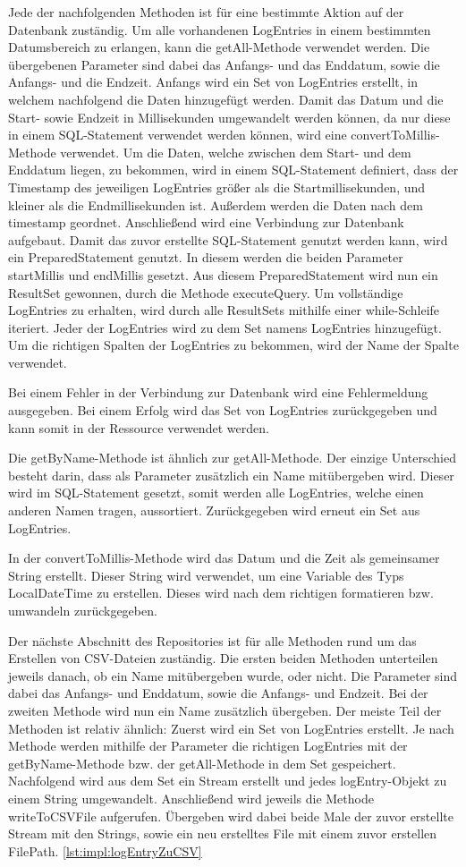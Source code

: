 Jede der nachfolgenden Methoden ist für eine bestimmte Aktion auf der Datenbank zuständig.
Um alle vorhandenen LogEntries in einem bestimmten Datumsbereich zu erlangen, kann die getAll-Methode verwendet werden. Die übergebenen Parameter sind dabei das Anfangs- und das Enddatum, sowie die Anfangs- und die Endzeit. Anfangs wird ein Set von LogEntries erstellt, in welchem nachfolgend die Daten hinzugefügt werden. Damit das Datum und die Start- sowie Endzeit in Millisekunden umgewandelt werden können, da nur diese in einem SQL-Statement verwendet werden können, wird eine convertToMillis-Methode verwendet.
Um die Daten, welche zwischen dem Start- und dem Enddatum liegen, zu bekommen, wird in einem SQL-Statement definiert, dass der Timestamp des jeweiligen LogEntries größer als die Startmillisekunden, und kleiner als die Endmillisekunden ist. Außerdem werden die Daten nach dem timestamp geordnet. Anschließend wird eine Verbindung zur Datenbank aufgebaut. Damit das zuvor erstellte SQL-Statement genutzt werden kann, wird ein PreparedStatement genutzt. In diesem werden die beiden Parameter startMillis und endMillis gesetzt. Aus diesem PreparedStatement wird nun ein ResultSet gewonnen, durch die Methode executeQuery. Um vollständige LogEntries zu erhalten, wird durch alle ResultSets mithilfe einer while-Schleife iteriert. Jeder der LogEntries wird zu dem Set namens LogEntries hinzugefügt. Um die richtigen Spalten der LogEntries zu bekommen, wird der Name der Spalte verwendet.


Bei einem Fehler in der Verbindung zur Datenbank wird eine Fehlermeldung ausgegeben. Bei einem Erfolg wird das Set von LogEntries zurückgegeben und kann somit in der Ressource verwendet werden.


Die getByName-Methode ist ähnlich zur getAll-Methode. Der einzige Unterschied besteht darin, dass als Parameter zusätzlich ein Name mitübergeben wird. Dieser wird im SQL-Statement gesetzt, somit werden alle LogEntries, welche einen anderen Namen tragen, aussortiert. Zurückgegeben wird erneut ein Set aus LogEntries.


In der convertToMillis-Methode wird das Datum und die Zeit als gemeinsamer String erstellt. Dieser String wird verwendet, um eine Variable des Typs LocalDateTime zu erstellen. Dieses wird nach dem richtigen formatieren bzw. umwandeln zurückgegeben.


Der nächste Abschnitt des Repositories ist für alle Methoden rund um das Erstellen von CSV-Dateien zuständig. Die ersten beiden Methoden unterteilen jeweils danach, ob ein Name mitübergeben wurde, oder nicht. Die Parameter sind dabei das Anfangs- und Enddatum, sowie die Anfangs- und Endzeit. Bei der zweiten Methode wird nun ein Name zusätzlich übergeben. Der meiste Teil der Methoden ist relativ ähnlich: Zuerst wird ein Set von LogEntries erstellt. Je nach Methode werden mithilfe der Parameter die richtigen LogEntries mit der getByName-Methode bzw. der getAll-Methode in dem Set gespeichert. Nachfolgend wird aus dem Set ein Stream erstellt und jedes logEntry-Objekt zu einem String umgewandelt. Anschließend wird jeweils die Methode writeToCSVFile aufgerufen. Übergeben wird dabei beide Male der zuvor erstellte Stream mit den Strings, sowie ein neu erstelltes File mit einem zuvor erstellen FilePath. \ref{lst:impl:logEntryZuCSV}


